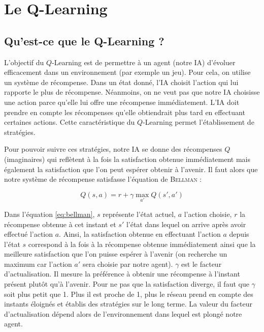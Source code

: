 \section{Le Q-Learning}

\subsection{Qu'est-ce que le Q-Learning ?}

L'objectif du $Q$-Learning est de permettre à un agent (notre IA) d'évoluer efficacement dans un environnement (par exemple un jeu). Pour cela, on utilise un système de
récompense. Dans un état donné, l'IA choisit l'action qui lui rapporte le plus de récompense. Néanmoins, on ne veut pas que notre IA choisisse une action parce qu'elle
lui offre une récompense immédiatement. L'IA doit prendre en compte les récompenses qu'elle obtiendrait plus tard en effectuant certaines actions. Cette 
caractéristique du $Q$-Learning permet l'établissement de stratégies.

Pour pouvoir suivre ces stratégies, notre IA se donne des récompenses $Q$ (imaginaires) qui reflètent à la fois la satisfaction obtenue immédiatement mais également
la satisfaction que l'on peut espérer obtenir à l'avenir. Il faut alors que notre système de récompense satisfasse l'équation de \textsc{Bellman} : 

\begin{equation}
 Q\left(s,a\right) = r + \gamma \max_{a'} Q\left(s',a'\right)
 \label{eq:bellman}
\end{equation}

Dans l'équation \ref{eq:bellman}, $s$ représente l'état actuel, $a$ l'action choisie, $r$ la récompense obtenue à cet instant et $s'$ l'état dans lequel on arrive
après avoir effectué l'action $a$. Ainsi, la satisfaction obtenue en effectuant l'action $a$ depuis l'état $s$ correspond à la fois à la récompense obtenue immédiatement
ainsi que la meilleure satisfaction que l'on puisse espérer à l'avenir (on recherche un maximum car l'action $a'$ sera choisie par notre agent). $\gamma$ est le facteur
d'actualisation. Il mesure la préférence à obtenir une récompense à l'instant présent plutôt qu'à l'avenir. Pour ne pas que la satisfaction diverge, il faut que $\gamma$
soit plus petit que 1. Plus il est proche de 1, plus le réseau prend en compte des instants éloignés et établis des stratégies sur le long terme. La valeur du facteur
d'actualisation dépend alors de l'environnement dans lequel est plongé notre agent.


